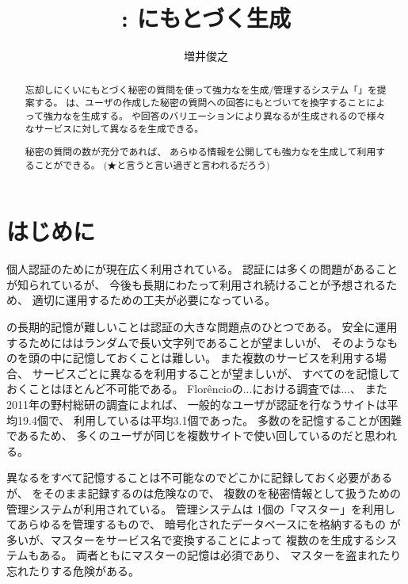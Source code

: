\documentclass[twoside]{wiss}
\begin{document}
\title{{\EP}: {\EM}にもとづく{\PW}生成}

\author{増井俊之}

\begin{abstract}
忘却しにくい{\EM}にもとづく秘密の質問を使って強力な{\PW}を生成/管理するシステム「\textsf{\EP}」を提案する。
{\EP}は、ユーザの作成した秘密の質問への回答にもとづいて{\SS}を換字することによって強力な{\PW}を生成する。
{\SS}や回答のバリエーションにより異なる{\PW}が生成されるので様々なサービスに対して異なる{\PW}を生成できる。

秘密の質問の数が充分であれば、
あらゆる情報を公開しても強力な{\PW}を生成して利用することができる。
(★と言うと言い過ぎと言われるだろう)
\end{abstract}

\maketitle

\section{はじめに}

個人認証のために{\PW}が現在広く利用されている。
{\PW}認証には多くの問題があることが知られているが\cite{増井_ユニマガ}、
今後も長期にわたって利用され続けることが予想されるため、
適切に運用するための工夫が必要になっている。

{\PW}の長期的記憶が難しいことは{\PW}認証の大きな問題点のひとつである。
安全に運用するためには{\PW}はランダムで長い文字列であることが望ましいが、
そのようなものを頭の中に記憶しておくことは難しい。
また複数のサービスを利用する場合、
サービスごとに異なる{\PW}を利用することが望ましいが、
すべての{\PW}を記憶しておくことはほとんど不可能である。
%
Flor\^{e}ncioの...における調査では...\cite{Florencio:2007:LSW:1242572.1242661}、
また2011年の野村総研の調査によれば、
一般的なユーザが{\PW}認証を行なうサイトは平均19.4個で、
利用している{\PW}は平均3.1個であった\cite{野村総研}。
多数の{\PW}を記憶することが困難であるため、
多くのユーザが同じ{\PW}を複数サイトで使い回しているのだと思われる。

異なる{\PW}をすべて記憶することは不可能なのでどこかに記録しておく必要があるが、
{\PW}をそのまま記録するのは危険なので、
複数の{\PW}を秘密情報として扱うための{\PW}管理システムが利用されている。
{\PW}管理システムは
1個の「マスター{\PW}」を利用してあらゆる{\PW}を管理するもので、
暗号化されたデータベースに{\PW}を格納するもの%
\cite{OnePassword}%
\cite{Dashlane}%
\cite{ミルパス}%
\cite{LastPass}%
\cite{KeyPass}%
\cite{NortonIDSafe}%
\cite{IDManager}%
が多いが、マスター{\PW}をサービス名で変換することによって
複数の{\PW}を生成するシステム\cite{SuperGenPass}もある。
両者ともにマスター{\PW}の記憶は必須であり、
マスター{\PW}を盗まれたり忘れたりする危険がある。
\end{document}
